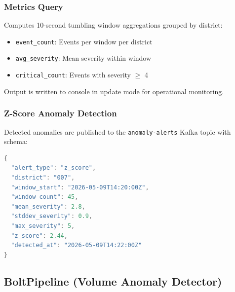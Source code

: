 \documentclass[12pt,a4paper]{article}
\begin{document}
\subsubsection{Metrics Query}

Computes 10-second tumbling window aggregations grouped by district:
\begin{itemize}
  \item \texttt{event\_count}: Events per window per district
  \item \texttt{avg\_severity}: Mean severity within window
  \item \texttt{critical\_count}: Events with severity $\geq$ 4
\end{itemize}
Output is written to console in update mode for operational monitoring.

\subsubsection{Z-Score Anomaly Detection}

\noindent{}

Detected anomalies are published to the \texttt{anomaly-alerts} Kafka topic with schema:
\begin{lstlisting}[language=Java, caption={Anomaly alert JSON schema}]
{
  "alert_type": "z_score",
  "district": "007",
  "window_start": "2026-05-09T14:20:00Z",
  "window_count": 45,
  "mean_severity": 2.8,
  "stddev_severity": 0.9,
  "max_severity": 5,
  "z_score": 2.44,
  "detected_at": "2026-05-09T14:22:00Z"
}
\end{lstlisting}

\subsection{BoltPipeline (Volume Anomaly Detector)}
\end{document}

